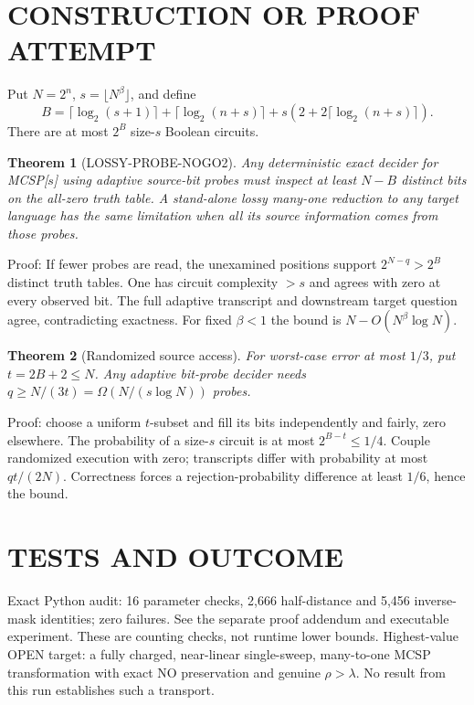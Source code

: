 \documentclass{article}
\newtheorem{theorem}{Theorem}
\begin{document}
\section{CONSTRUCTION OR PROOF ATTEMPT}
Put $N=2^n$, $s=\lfloor N^\beta\rfloor$, and define
\[
 B=\lceil\log_2(s+1)\rceil+\lceil\log_2(n+s)\rceil+
 s(2+2\lceil\log_2(n+s)\rceil).
\]
There are at most $2^B$ size-$s$ Boolean circuits.
\begin{theorem}[LOSSY-PROBE-NOGO2]
Any deterministic exact decider for MCSP[$s$] using adaptive
source-bit probes must inspect at least $N-B$ distinct bits
on the all-zero truth table. A stand-alone lossy many-one
reduction to any target language has the same limitation
when all its source information comes from those probes.
\end{theorem}
\noindent Proof: If fewer probes are read, the unexamined
positions support $2^{N-q}>2^B$ distinct truth tables.
One has circuit complexity $>s$ and agrees with zero
at every observed bit. The full adaptive transcript and
downstream target question agree, contradicting exactness.
For fixed $\beta<1$ the bound is $N-O(N^\beta\log N)$.
\begin{theorem}[Randomized source access]
For worst-case error at most $1/3$, put $t=2B+2\le N$.
Any adaptive bit-probe decider needs
$q\ge N/(3t)=\Omega(N/(s\log N))$ probes.
\end{theorem}
\noindent Proof: choose a uniform $t$-subset and fill its
bits independently and fairly, zero elsewhere. The
probability of a size-$s$ circuit is at most $2^{B-t}\le1/4$.
Couple randomized execution with zero; transcripts
differ with probability at most $qt/(2N)$.
Correctness forces a rejection-probability difference
at least $1/6$, hence the bound.
\section{TESTS AND OUTCOME}
Exact Python audit: 16 parameter checks, 2,666 half-distance
and 5,456 inverse-mask identities; zero failures.
See the separate proof addendum and executable experiment.
These are counting checks, not runtime lower bounds.
\noindent Highest-value OPEN target: a fully charged,
near-linear single-sweep, many-to-one MCSP transformation
with exact NO preservation and genuine $\rho>\lambda$.
No result from this run establishes such a transport.


\end{document}
